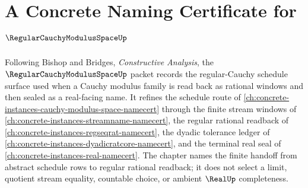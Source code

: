 \chapter{A Concrete Naming Certificate for $\RegularCauchyModulusSpaceUp$}
\label{ch:concrete-instances-regular-cauchy-modulus-space-namecert}

Following Bishop and Bridges, \emph{Constructive Analysis}, the
$\RegularCauchyModulusSpaceUp$ packet records the regular-Cauchy schedule
surface used when a Cauchy modulus family is read back as rational windows and
then sealed as a real-facing name. It refines the schedule route of
\autoref{ch:concrete-instances-cauchy-modulus-space-namecert} through the
finite stream windows of \autoref{ch:concrete-instances-streamname-namecert},
the regular rational readback of
\autoref{ch:concrete-instances-regseqrat-namecert}, the dyadic tolerance ledger
of \autoref{ch:concrete-instances-dyadicratcore-namecert}, and the terminal
real seal of \autoref{ch:concrete-instances-real-namecert}. The chapter names
the finite handoff from abstract schedule rows to regular rational readback; it
does not select a limit, quotient stream equality, countable choice, or ambient
$\RealUp$ completeness.

